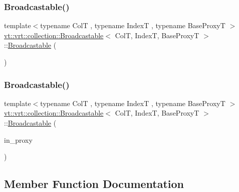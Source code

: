 \subsubsection{\texorpdfstring{Broadcastable()}{Broadcastable()}\hspace{0.1cm}{\footnotesize\ttfamily [3/4]}}
{\footnotesize\ttfamily template$<$typename ColT , typename IndexT , typename Base\+ProxyT $>$ \\
\hyperlink{structvt_1_1vrt_1_1collection_1_1_broadcastable}{vt\+::vrt\+::collection\+::\+Broadcastable}$<$ ColT, IndexT, Base\+ProxyT $>$\+::\hyperlink{structvt_1_1vrt_1_1collection_1_1_broadcastable}{Broadcastable} (\begin{DoxyParamCaption}\item[{\hyperlink{structvt_1_1vrt_1_1collection_1_1_broadcastable}{Broadcastable}$<$ ColT, IndexT, Base\+ProxyT $>$ \&\&}]{ }\end{DoxyParamCaption})\hspace{0.3cm}{\ttfamily [default]}}

\mbox{\label{structvt_1_1vrt_1_1collection_1_1_broadcastable_a62e91c5dfe22893acb08c01289de3941}} 
\subsubsection{\texorpdfstring{Broadcastable()}{Broadcastable()}\hspace{0.1cm}{\footnotesize\ttfamily [4/4]}}
{\footnotesize\ttfamily template$<$typename ColT , typename IndexT , typename Base\+ProxyT $>$ \\
\hyperlink{structvt_1_1vrt_1_1collection_1_1_broadcastable}{vt\+::vrt\+::collection\+::\+Broadcastable}$<$ ColT, IndexT, Base\+ProxyT $>$\+::\hyperlink{structvt_1_1vrt_1_1collection_1_1_broadcastable}{Broadcastable} (\begin{DoxyParamCaption}\item[{\hyperlink{namespacevt_a1b417dd5d684f045bb58a0ede70045ac}{Virtual\+Proxy\+Type} const}]{in\+\_\+proxy }\end{DoxyParamCaption})}



\subsection{Member Function Documentation}
\mbox{\label{structvt_1_1vrt_1_1collection_1_1_broadcastable_a0a08e1ab7c78e36b3ecb5b6a4d399dab}} 
